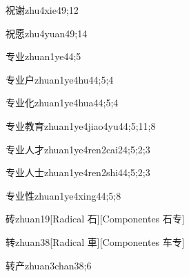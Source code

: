 \begin{verbete}{祝谢}{zhu4xie4}{9;12}
\end{verbete}

\begin{verbete}{祝愿}{zhu4yuan4}{9;14}
\end{verbete}

\begin{verbete}{专业}{zhuan1ye4}{4;5}
\end{verbete}

\begin{verbete}{专业户}{zhuan1ye4hu4}{4;5;4}
\end{verbete}

\begin{verbete}{专业化}{zhuan1ye4hua4}{4;5;4}
\end{verbete}

\begin{verbete}{专业教育}{zhuan1ye4jiao4yu4}{4;5;11;8}
\end{verbete}

\begin{verbete}{专业人才}{zhuan1ye4ren2cai2}{4;5;2;3}
\end{verbete}

\begin{verbete}{专业人士}{zhuan1ye4ren2shi4}{4;5;2;3}
\end{verbete}

\begin{verbete}{专业性}{zhuan1ye4xing4}{4;5;8}
\end{verbete}

\begin{verbete}{砖}{zhuan1}{9}[Radical 石][Componentes 石专]
\end{verbete}

\begin{verbete}{转}{zhuan3}{8}[Radical 車][Componentes 车专]
\end{verbete}

\begin{verbete}{转产}{zhuan3chan3}{8;6}
\end{verbete}

